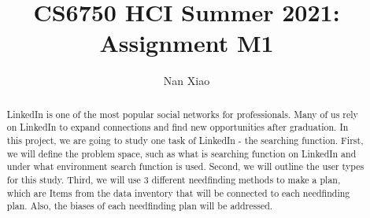 \documentclass[
	letterpaper, %
]{jdf}
\author{Nan Xiao}
\title{CS6750 HCI Summer 2021:\\Assignment M1}
\begin{document}

\maketitle

\begin{abstract}
LinkedIn is one of the most popular social networks for professionals. Many of us rely on LinkedIn to expand connections and find new opportunities after graduation. In this project, we are going to study one task of LinkedIn - the searching function. First, we will define the problem space, such as what is searching function on LinkedIn and under what environment search function is used. Second, we will outline the user types for this study. Third, we will use 3 different needfinding methods to make a plan, which are  Items from the data inventory that will be connected to each needfinding plan. Also, the biases of each needfinding plan will be addressed.
\end{abstract}
\end{document}
